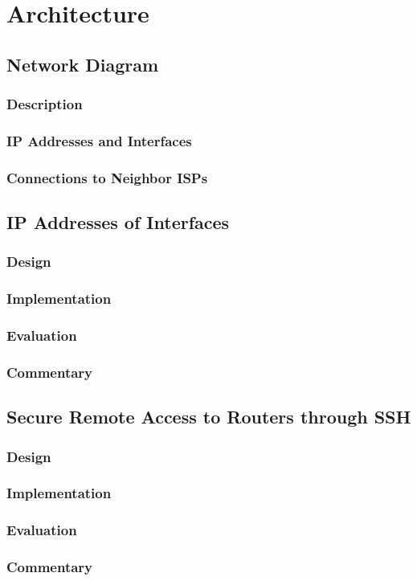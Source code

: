 \chapter{Architecture}
\label{chap:architecture}

\section{Network Diagram}

\subsection{Description}

\subsection{IP Addresses and Interfaces}

\subsection{Connections to Neighbor ISPs}



\section{IP Addresses of Interfaces}

\subsection{Design}

\subsection{Implementation}

\subsection{Evaluation}

\subsection{Commentary}



\section{Secure Remote Access to Routers through SSH}

\subsection{Design}

\subsection{Implementation}

\subsection{Evaluation}

\subsection{Commentary}

